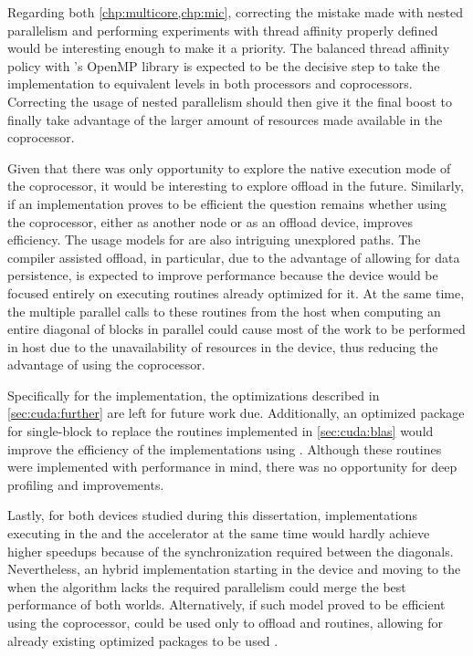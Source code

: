 \documentclass[../thesis]{subfiles}
\begin{document}
	Regarding both \cref{chp:multicore,chp:mic}, correcting the mistake made with nested parallelism and performing experiments with thread affinity properly defined would be interesting enough to make it a priority. The balanced thread affinity policy with \intel's OpenMP library is expected to be the decisive step to take the implementation to equivalent levels in both \xeon processors and \intel\xeonphi coprocessors. Correcting the usage of nested parallelism should then give it the final boost to finally take advantage of the larger amount of resources made available in the coprocessor.

	Given that there was only opportunity to explore the native execution mode of the \intel\xeonphi coprocessor, it would be interesting to explore offload in the future. Similarly, if an \mpi implementation proves to be efficient the question remains whether using the coprocessor, either as another node or as an offload device, improves efficiency. The usage models for \intel\mkl are also intriguing unexplored paths. The compiler assisted offload, in particular, due to the advantage of allowing for data persistence, is expected to improve performance because the device would be focused entirely on executing routines already optimized for it. At the same time, the multiple parallel calls to these routines from the host when computing an entire diagonal of blocks in parallel could cause most of the work to be performed in host due to the unavailability of resources in the device, thus reducing the advantage of using the coprocessor.

	Specifically for the \cuda implementation, the optimizations described in \cref{sec:cuda:further} are left for future work due. Additionally, an optimized \blas package for single-block to replace the routines implemented in \cref{sec:cuda:blas} would improve the efficiency of the implementations using \gpus. Although these routines were implemented with performance in mind, there was no opportunity for deep profiling and improvements.

	Lastly, for both devices studied during this dissertation, implementations executing in the \cpus and the accelerator at the same time would hardly achieve higher speedups because of the synchronization required between the diagonals. Nevertheless, an hybrid implementation starting in the device and moving to the \cpu when the algorithm lacks the required parallelism could merge the best performance of both worlds. Alternatively, if such model proved to be efficient using the \intel\xeonphi coprocessor, \nvidia\gpus could be used only to offload \blas and \lapack routines, allowing for already existing optimized packages to be used \cite{NVIDIA:CUBLAS:5:0,PLASMA:MAGMA,CULA:LAPACK}.
\end{document}
